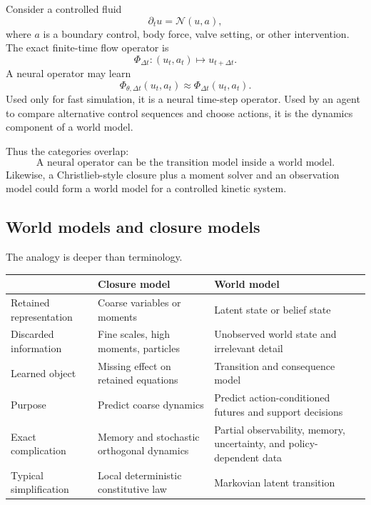 \documentclass[11pt]{article}
\newcommand{\N}{\mathcal{N}}
\begin{document}
Consider a controlled fluid
\begin{equation}
 \partial_tu=\N(u,a),
\end{equation}
where \(a\) is a boundary control, body force, valve setting, or other intervention. The exact finite-time flow operator is
\begin{equation}
 \Phi_{\Delta t}:(u_t,a_t)\longmapsto u_{t+\Delta t}.
\end{equation}
A neural operator may learn
\[
 \Phi_{\theta,\Delta t}(u_t,a_t)
 \approx
 \Phi_{\Delta t}(u_t,a_t).
\]
Used only for fast simulation, it is a neural time-step operator. Used by an agent to compare alternative control sequences and choose actions, it is the dynamics component of a world model.

Thus the categories overlap:
\[
\boxed{
\text{A neural operator can be the transition model inside a world model.}
}
\]
Likewise, a Christlieb-style closure plus a moment solver and an observation model could form a world model for a controlled kinetic system.

\subsection{World models and closure models}

The analogy is deeper than terminology.

\begin{center}
\begin{tabularx}{\textwidth}{@{}P{0.22\textwidth}Y Y@{}}
\toprule
& \textbf{Closure model} & \textbf{World model} \\
\midrule
Retained representation & Coarse variables or moments & Latent state or belief state \\
Discarded information & Fine scales, high moments, particles & Unobserved world state and irrelevant detail \\
Learned object & Missing effect on retained equations & Transition and consequence model \\
Purpose & Predict coarse dynamics & Predict action-conditioned futures and support decisions \\
Exact complication & Memory and stochastic orthogonal dynamics & Partial observability, memory, uncertainty, and policy-dependent data \\
Typical simplification & Local deterministic constitutive law & Markovian latent transition \\
\bottomrule
\end{tabularx}
\end{center}
\end{document}
